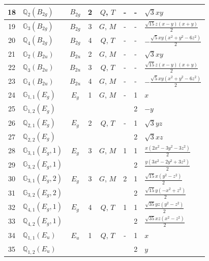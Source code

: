 \documentclass[fleqn,10pt,landscape]{jsarticle}
\begin{document}
\begin{longtable}[l]{clcccccl}
18 & $\mathbb{Q}_{2}(B_{2g})$ & $B_{2g}$ & 2 & $Q$, $T$ & - & - & $\sqrt{3} x y$ \\ \hline
19 & $\mathbb{G}_{3}(B_{2g})$ & $B_{2g}$ & 3 & $G$, $M$ & - & - & $\frac{\sqrt{15} z \left(x - y\right) \left(x + y\right)}{2}$ \\ \hline
20 & $\mathbb{Q}_{4}(B_{2g})$ & $B_{2g}$ & 4 & $Q$, $T$ & - & - & $- \frac{\sqrt{5} x y \left(x^{2} + y^{2} - 6 z^{2}\right)}{2}$ \\ \hline
21 & $\mathbb{G}_{2}(B_{2u})$ & $B_{2u}$ & 2 & $G$, $M$ & - & - & $\sqrt{3} x y$ \\ \hline
22 & $\mathbb{Q}_{3}(B_{2u})$ & $B_{2u}$ & 3 & $Q$, $T$ & - & - & $\frac{\sqrt{15} z \left(x - y\right) \left(x + y\right)}{2}$ \\ \hline
23 & $\mathbb{G}_{4}(B_{2u})$ & $B_{2u}$ & 4 & $G$, $M$ & - & - & $- \frac{\sqrt{5} x y \left(x^{2} + y^{2} - 6 z^{2}\right)}{2}$ \\ \hline
24 & $\mathbb{G}_{1,1}(E_{g})$ & $E_{g}$ & 1 & $G$, $M$ & - & 1 & $x$ \\
25 & $\mathbb{G}_{1,2}(E_{g})$ &  &  &  &  & 2 & $- y$ \\ \hline
26 & $\mathbb{Q}_{2,1}(E_{g})$ & $E_{g}$ & 2 & $Q$, $T$ & - & 1 & $\sqrt{3} y z$ \\
27 & $\mathbb{Q}_{2,2}(E_{g})$ &  &  &  &  & 2 & $\sqrt{3} x z$ \\ \hline
28 & $\mathbb{G}_{3,1}(E_{g},1)$ & $E_{g}$ & 3 & $G$, $M$ & 1 & 1 & $\frac{x \left(2 x^{2} - 3 y^{2} - 3 z^{2}\right)}{2}$ \\
29 & $\mathbb{G}_{3,2}(E_{g},1)$ &  &  &  &  & 2 & $\frac{y \left(3 x^{2} - 2 y^{2} + 3 z^{2}\right)}{2}$ \\ \hline
30 & $\mathbb{G}_{3,1}(E_{g},2)$ & $E_{g}$ & 3 & $G$, $M$ & 2 & 1 & $\frac{\sqrt{15} x \left(y^{2} - z^{2}\right)}{2}$ \\
31 & $\mathbb{G}_{3,2}(E_{g},2)$ &  &  &  &  & 2 & $\frac{\sqrt{15} y \left(- x^{2} + z^{2}\right)}{2}$ \\ \hline
32 & $\mathbb{Q}_{4,1}(E_{g},1)$ & $E_{g}$ & 4 & $Q$, $T$ & 1 & 1 & $\frac{\sqrt{35} y z \left(y^{2} - z^{2}\right)}{2}$ \\
33 & $\mathbb{Q}_{4,2}(E_{g},1)$ &  &  &  &  & 2 & $\frac{\sqrt{35} x z \left(x^{2} - z^{2}\right)}{2}$ \\ \hline
34 & $\mathbb{Q}_{1,1}(E_{u})$ & $E_{u}$ & 1 & $Q$, $T$ & - & 1 & $x$ \\
35 & $\mathbb{Q}_{1,2}(E_{u})$ &  &  &  &  & 2 & $y$ \\ \hline

\end{longtable}
\end{document}
